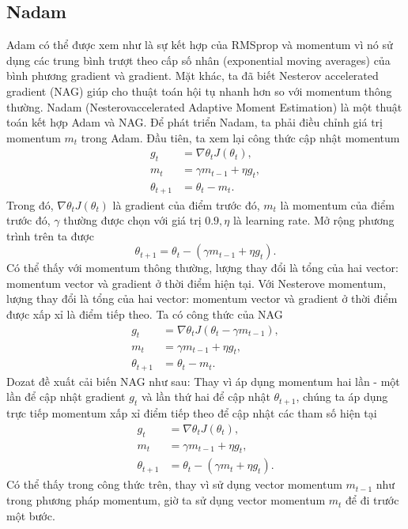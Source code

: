 \documentclass[11pt,oneside,a4paper]{report}
\theoremstyle{definition}
\begin{document}
\subsection{Nadam}
Adam có thể được xem như là sự kết hợp của RMSprop và momentum vì nó sử dụng các trung bình trượt theo cấp số nhân (exponential moving averages) của bình phương gradient và gradient. Mặt khác, ta đã biết Nesterov accelerated gradient (NAG) giúp cho thuật toán hội tụ nhanh hơn so với momentum thông thường. Nadam (Nesterovaccelerated Adaptive Moment Estimation) là một thuật toán kết hợp Adam và NAG. Để phát triển Nadam, ta phải điều chỉnh giá trị momentum $m_t$ trong Adam. Đầu tiên, ta xem lại công thức cập nhật momentum
$$
\begin{aligned}
g_t &=\nabla \theta_t J\left(\theta_t\right), \\
m_t &=\gamma m_{t-1}+\eta g_t, \\
\theta_{t+1} &=\theta_t-m_t.
\end{aligned}
$$
Trong đó, $\nabla \theta_t J\left(\theta_t\right)$ là gradient của điểm trước đó, $m_t$ là momentum của điểm trước đó, $\gamma$ thường được chọn với giá trị $0.9, \eta$ là learning rate.
Mở rộng phương trình trên ta được
$$
\theta_{t+1}=\theta_t-\left(\gamma m_{t-1}+\eta g_t\right).
$$
Có thể thấy với momentum thông thường, lượng thay đổi là tổng của hai vector: momentum vector và gradient ở thời điểm hiện tại.
Với Nesterove momentum, lượng thay đổi là tổng của hai vector: momentum vector và gradient ở thời điểm được xấp xỉ là điểm tiếp theo. Ta có công thức của NAG
$$
\begin{aligned}
g_t &=\nabla \theta_t J\left(\theta_t-\gamma m_{t-1}\right), \\
m_t &=\gamma m_{t-1}+\eta g_t, \\
\theta_{t+1} &=\theta_t-m_t.
\end{aligned}
$$
Dozat đề xuất cải biến NAG như sau: Thay vì áp dụng momentum hai lần - một lần để cập nhật gradient $g_t$ và lần thứ hai để cập nhật $\theta_{t+1}$, chúng ta áp dụng trực tiếp momentum xấp xỉ điểm tiếp theo để cập nhật các tham số hiện tại
$$
\begin{aligned}
g_t &=\nabla \theta_t J\left(\theta_t\right), \\
m_t &=\gamma m_{t-1}+\eta g_t,\\
\theta_{t+1} &=\theta_t-\left(\gamma m_t+\eta g_t\right).
\end{aligned}
$$
Có thể thấy trong công thức trên, thay vì sử dụng vector momentum $m_{t-1}$ như trong phương pháp momentum, giờ ta sử dụng vector momentum $m_t$ để đi trước một bước.
\end{document}
